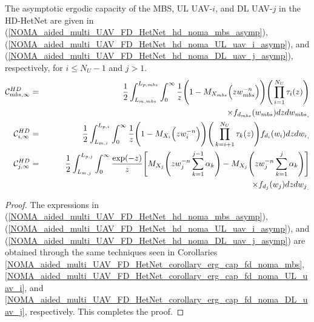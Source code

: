 \begin{corollary} \label{NOMA_aided_multi_UAV_FD_HetNet_corollary_erg_cap_hd_noma}
The asymptotic ergodic capacity of the MBS, UL UAV-$i$, and DL UAV-$j$ in the HD-HetNet are given in (\ref{NOMA_aided_multi_UAV_FD_HetNet_hd_noma_mbs_asymp}), (\ref{NOMA_aided_multi_UAV_FD_HetNet_hd_noma_UL_uav_i_asymp}), and (\ref{NOMA_aided_multi_UAV_FD_HetNet_hd_noma_DL_uav_j_asymp}), respectively, for $i\leq N_U-1$ and $j>1$.
\begin{eqnarray} 
\mathcal{C}_{mbs,\infty}^{HD} & = &  \frac{1}{2} \int_{L_{m,mbs}}^{L_{p,mbs}} \int_{0}^{\infty} \frac{1}{z} \Bigg(1-M_{X_{mbs}}\Big(z w_{mbs}^{-n}\Big)\Bigg) \Bigg( \prod_{i=1}^{N_U} \tau_i(z) \Bigg) \nonumber \\
 & & \hspace{7.7cm} \times f_{d_{mbs}}(w_{mbs}) {dz dw_{mbs}}_, \label{NOMA_aided_multi_UAV_FD_HetNet_hd_noma_mbs_asymp} \\
\mathcal{C}_{i,\infty}^{HD} & = & \frac{1}{2} \int_{L_{m,i}}^{L_{p,i}} \int_{0}^{\infty} \frac{1}{z} \Bigg(1-M_{X_{i}}\Big(z w_{i}^{-n}\Big)\Bigg) \Bigg( \prod_{k=i+1}^{N_U} \tau_k(z) \Bigg) f_{d_{i}}(w_{i}) {dz dw_{i}}_, \label{NOMA_aided_multi_UAV_FD_HetNet_hd_noma_UL_uav_i_asymp} \\
\mathcal{C}_{j,\infty}^{HD} & = & \frac{1}{2} \int_{L_{m,j}}^{L_{p,j}} \int_{0}^{\infty} \frac{\exp(-z)}{z} \Bigg[M_{X_j}\Bigg(z w_j^{-n} \sum_{k=1}^{j-1}\alpha_k \Bigg) - M_{X_j}\Bigg(z w_j^{-n} \sum_{k=1}^{j}\alpha_k\Bigg)\Bigg] \nonumber \\
 & & \hspace{8.8cm} \times  f_{d_{j}}(w_j) dz {dw_j}_. \label{NOMA_aided_multi_UAV_FD_HetNet_hd_noma_DL_uav_j_asymp}
\end{eqnarray}
\end{corollary}
\begin{proof}
The expressions in (\ref{NOMA_aided_multi_UAV_FD_HetNet_hd_noma_mbs_asymp}), (\ref{NOMA_aided_multi_UAV_FD_HetNet_hd_noma_UL_uav_i_asymp}), and (\ref{NOMA_aided_multi_UAV_FD_HetNet_hd_noma_DL_uav_j_asymp}) are obtained through the same techniques seen in Corollaries \ref{NOMA_aided_multi_UAV_FD_HetNet_corollary_erg_cap_fd_noma_mbs}, \ref{NOMA_aided_multi_UAV_FD_HetNet_corollary_erg_cap_fd_noma_UL_uav_i}, and \ref{NOMA_aided_multi_UAV_FD_HetNet_corollary_erg_cap_fd_noma_DL_uav_j}, respectively. This completes the proof.
\end{proof}

